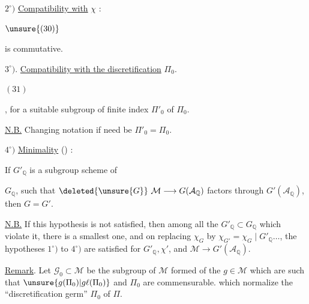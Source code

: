 \(2^\circ)\) \uline{Compatibility with} \(\chi\) :

\begin{samepage}
\(\unsure{(30)}\)
\end{samepage}
is commutative.

\(3^\circ)\). \uline{Compatibility with the discretification} \(\Pi_0\).

\begin{samepage}
\((31)\)
\end{samepage},
for a suitable subgroup of finite index \(\Pi'_0\) of \(\Pi_0\).

\uline{N.B.} Changing notation if need be  \(\Pi'_0=\Pi_0\).

\(4^\circ)\) \uline{Minimality} () :

If \(G'_{\mathbb{Q}}\) is a subgroup scheme of


\(G_{\mathbb{Q}}\), such that \(\deleted{\unsure{G}}\ \mathcal{M}\longrightarrow G(\mathcal{A}_{\mathbb{Q}})\) factors through \(G'(\mathcal{A}_{\mathbb{Q}})\), then \(G=G'\).

\uline{N.B.} If this hypothesis is not satisfied, then among all the \(G'_{\mathbb{Q}}\subset G_{\mathbb{Q}}\) which violate it, there is a  smallest one, and on replacing \(\chi_G\) by \(\chi_{G'}=\chi_G\mid G'_{\mathbb{Q}}\ldots\), the hypotheses \(1^\circ)\) to \(4^\circ)\) are satisfied for \(G'_{\mathbb{Q}},\chi'\), and \(\mathcal{M}\longrightarrow G'(\mathcal{A}_{\mathbb{Q}})\).

\uline{Remark}. Let \(\mathcal{G}_0\subset\mathcal{M}\) be the subgroup of \(\mathcal{M}\) formed of the \(g\in\mathcal{M}\) which are such that \(\unsure{g(\Pi_0)|g\ell(\Pi_0)}\) and \(\Pi_0\) are commensurable.   which normalize the ``discretification germ'' \(\Pi_0\) of \(\Pi\).

